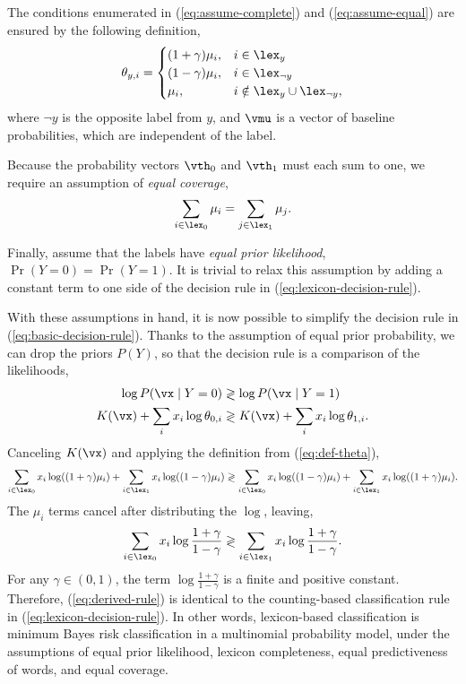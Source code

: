 The conditions enumerated in (\ref{eq:assume-complete}) and (\ref{eq:assume-equal}) are ensured by the following definition,
\begin{equation}
\theta_{y,i} = \begin{cases}
(1+\gamma) \mu_i, & i \in \lex_y \\
(1-\gamma) \mu_i, & i \in \lex_{\neg y}\\
\mu_i, & i \notin \lex_y \cup \lex_{\neg y},
\end{cases}
\label{eq:def-theta}
\end{equation}
where $\neg y$ is the opposite label from $y$, and $\vmu$ is a vector of baseline probabilities, which are independent of the label.

Because the probability vectors $\vth_0$ and $\vth_1$ must each sum to one, we require an assumption of \emph{equal coverage}, \begin{equation}
\sum_{i \in \lex_0} \mu_i = \sum_{j \in \lex_1} \mu_j.
\end{equation}

Finally, assume that the labels have \emph{equal prior likelihood}, $\Pr(Y=0) = \Pr(Y=1)$. It is trivial to relax this assumption by adding a constant term to one side of the decision rule in (\ref{eq:lexicon-decision-rule}).

With these assumptions in hand, it is now possible to simplify the decision rule in (\ref{eq:basic-decision-rule}). Thanks to the assumption of equal prior probability, we can drop the priors $P(Y)$, so that the decision rule is a comparison of the likelihoods,
\begin{align}
\log P(\vx \mid Y=0) & \gtrless \log P(\vx \mid Y=1)\\
K(\vx) + \sum_i x_i \log \theta_{0,i} & \gtrless K(\vx) + \sum_i x_i \log \theta_{1,i}.
\end{align}
Canceling $K(\vx)$ and applying the definition from (\ref{eq:def-theta}),
\begin{dmath}
 \sum_{i \in \lex_0} x_i \log ((1+\gamma)\mu_i) + \sum_{i \in \lex_1} x_i \log ((1-\gamma)\mu_i)\\
  \gtrless \sum_{i \in \lex_0} x_i \log ((1-\gamma)\mu_i) + \sum_{i \in \lex_1} x_i \log ((1+\gamma)\mu_i).
\end{dmath}
The $\mu_i$ terms cancel after distributing the $\log$, leaving,
\begin{align}
\sum_{i \in \lex_0} x_i \log \frac{1+\gamma}{1-\gamma}
\gtrless \sum_{i \in \lex_1} x_i \log \frac{1+\gamma}{1-\gamma}.
\label{eq:derived-rule}
\end{align}
For any $\gamma \in (0,1)$, the term $\log \frac{1+\gamma}{1-\gamma}$ is a finite and positive constant. Therefore, (\ref{eq:derived-rule}) is identical to the counting-based classification rule in (\ref{eq:lexicon-decision-rule}). In other words, lexicon-based classification is minimum Bayes risk classification in a multinomial probability model, under the assumptions of equal prior likelihood, lexicon completeness, equal predictiveness of words, and equal coverage.

